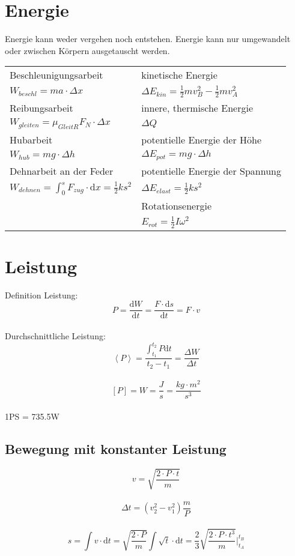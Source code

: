 \section{Energie}
Energie kann weder vergehen noch entstehen. Energie kann nur umgewandelt oder zwischen K\"orpern ausgetauscht werden.\\
\newline
\begin{tabular}{|l|l|}
		\hline
		\rowcolor{white}Beschleunigungsarbeit	& kinetische Energie\\
		\rowcolor{white}$W_{beschl}=ma\cdot\Delta x$	& $\Delta E_{kin}=\frac{1}{2}mv_B^2-\frac{1}{2}mv_A^2$\\
		\rowcolor{lgray}Reibungsarbeit				& innere, thermische Energie\\
		\rowcolor{lgray}$W_{gleiten}=\mu_{GleitR}F_N\cdot\Delta x$	& $\Delta Q$\\
		\rowcolor{white}Hubarbeit	& potentielle Energie der H\"ohe\\
		\rowcolor{white}$W_{hub}=mg\cdot\Delta h$	& $\Delta E_{pot}=mg\cdot\Delta h$\\
		\rowcolor{lgray}Dehnarbeit an der Feder				& potentielle Energie der Spannung\\
		\rowcolor{lgray}$W_{dehnen}=\int_0^sF_{zug}\cdot\mathrm{d}x=\frac{1}{2}ks^2$	& $\Delta E_{elast}=\frac{1}{2}ks^2$\\
		\rowcolor{white}	& Rotationsenergie\\
		\rowcolor{white}	& $E_{rot}=\frac{1}{2}I\omega^2$\\
		\hline
\end{tabular}

\section{Leistung}
Definition Leistung:
\[
	\boxed{
		P=\frac{\mathrm{d}W}{\mathrm{d}t}=\frac{F\cdot\mathrm{d}s}{\mathrm{d}t}=F\cdot v
	}
\]\\
Durchschnittliche Leistung:
\[
	\boxed{
		\left\langle P\right\rangle = \frac{\int_{t_1}^{t_2}P\mathrm{d}t}{t_2-t_1}=\frac{\Delta W}{\Delta t}
	}
\]\\
\[
	[P]=W=\frac{J}{s}=\frac{kg\cdot m^2}{s^3}
\]\\
1PS = 735.5W
\subsection{Bewegung mit konstanter Leistung}
\[
	\boxed{
		v=\sqrt{\frac{2\cdot P\cdot t}{m}}
	}
\]\\
\[
	\boxed{
		\Delta t=(v_2^2-v_1^2)\frac{m}{P}
	}
\]\\
\[
	\boxed{
		s=\int v\cdot\mathrm{d}t=\sqrt{\frac{2\cdot P}{m}}\int\sqrt{t}\cdot\mathrm{d}t=\frac{2}{3}\sqrt{\frac{2\cdot P\cdot t^3}{m}}\Bigg|_{t_A}^{t_B}
	}
\]\\